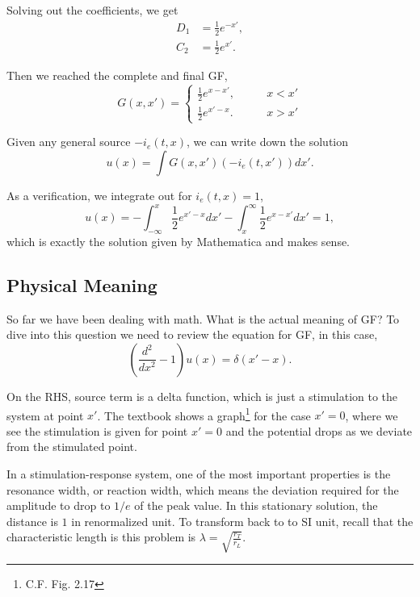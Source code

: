 Solving out the coefficients, we get
\begin{align*}
    D_1 & = \frac{1}{2}e^{-x'},\\
    C_2 &= \frac{1}{2}e^{x'}.
\end{align*}

Then we reached the complete and final GF,
\begin{equation*}
    G(x,x') = \begin{cases}
    \frac{1}{2}e^{x-x'}, & \qquad x<x'\\
    \frac{1}{2}e^{x' - x}. & \qquad x>x'
    \end{cases}
\end{equation*}

Given any general source $-i_e(t,x)$, we can write down the solution
\begin{equation*}
    u(x) = \int G(x,x') (-i_e(t,x') ) dx'.
\end{equation*}

As a verification, we integrate out for $i_e(t,x) = 1$,
\begin{equation*}
    u(x) = -\int_{-\infty}^{x}  \frac{1}{2}e^{x'-x} dx' - \int_{x}^{\infty} \frac{1}{2}e^{x - x'} dx' = 1,
\end{equation*}
which is exactly the solution given by Mathematica and makes sense.


\subsection{Physical Meaning}

So far we have been dealing with math. What is the actual meaning of GF? To dive into this question we need to review the equation for GF, in this case,
\begin{equation*}
   \left(\frac{d^2}{dx^2} -1\right) u(x) = \delta(x'-x).
\end{equation*}

On the RHS, source term is a delta function, which is just a stimulation to the system at point $x'$. The textbook shows a graph\footnote{C.F. Fig. 2.17} for the case $x'=0$, where we see the stimulation is given for point $x'=0$ and the potential drops as we deviate from the stimulated point.

In a stimulation-response system, one of the most important properties is the resonance width, or reaction width, which means the deviation required for the amplitude to drop to $1/e$ of the peak value. In this stationary solution, the distance is $1$ in renormalized unit. To transform back to to SI unit, recall that the characteristic length is this problem is $\lambda = \sqrt{\frac{r_T}{r_L}}$.


